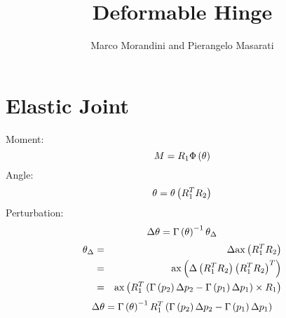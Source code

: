 \documentclass[12pt,dvips,fleqn]{article}
\begin{document}
\title{Deformable Hinge}
\author{Marco Morandini and Pierangelo Masarati}
\date{}
\maketitle

\section*{Elastic Joint}
Moment:
\begin{displaymath}
	M = R_1 \Phi\left( \theta \right)
\end{displaymath}
Angle:
\begin{displaymath}
	\theta = \theta\left( R_1^T R_2 \right)
\end{displaymath}
Perturbation:
\begin{displaymath}
	\Delta\theta = \Gamma\left( \theta \right)^{-1} \theta_{\Delta}
\end{displaymath}
\begin{eqnarray*}
	\theta_{\Delta} & = & \Delta \mathrm{ax}\left( R_1^T R_2 \right) \\
	& = & \mathrm{ax}\left( \Delta\left( R_1^T R_2 \right)\left( R_1^T R_2 \right)^T \right) \\
	& = & \mathrm{ax}\left( R_1^T\left( 
		\Gamma\left( p_2 \right)\Delta{p_2} - \Gamma\left( p_1 \right)\Delta{p_1}
	 \right)\times{R_1} \right)
\end{eqnarray*}
\begin{displaymath}
	\Delta\theta = \Gamma\left( \theta \right)^{-1} R_1^T\left( 
		\Gamma\left( p_2 \right)\Delta{p_2} - \Gamma\left( p_1 \right)\Delta{p_1}
	 \right)
\end{displaymath}
\end{document}
